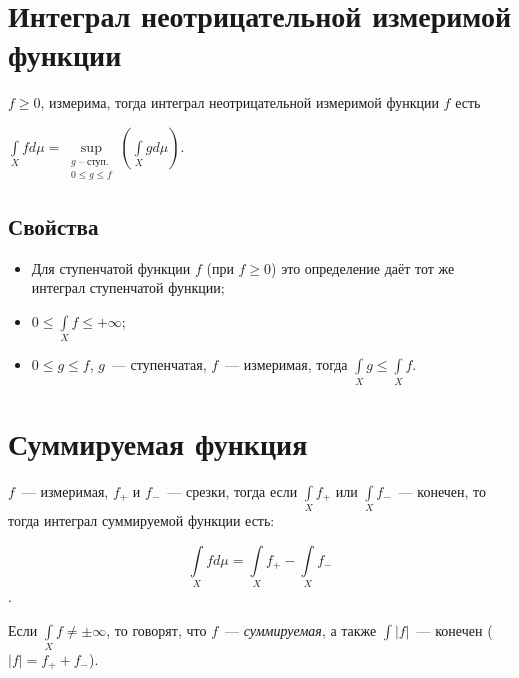 \documentclass{article}
\begin{document}
    \newpage
    
    \section{Интеграл неотрицательной измеримой функции}
    
        $f \geqslant 0$, измерима, тогда интеграл неотрицательной измеримой функции $f$ есть
        
        $\int\limits_{X} f d \mu = \sup\limits_{\substack{\text{$g$~-- ступ.} \\ 0 \leqslant g \leqslant f}} \left( \int\limits_{X} g d \mu \right)$.
            
        \subsection{Свойства}
                
            \begin{itemize}
                
                \item Для ступенчатой функции $f$ (при $f \geqslant 0$) это определение даёт тот же интеграл ступенчатой функции;
                    
                \item $0 \leqslant \int\limits_{X} f \leqslant +\infty$;
                    
                \item $0 \leqslant g \leqslant f$, $g$~--- ступенчатая, $f$~--- измеримая, тогда $\int\limits_{X} g \leqslant \int\limits_{X} f$.
                    
            \end{itemize}
                
    \newpage
    
    \section{Суммируемая функция}
    
        $f$~--- измеримая, $f_+$ и $f_-$~--- срезки, тогда если $\int\limits_{X} f_+$ или $\int\limits_{X} f_-$~--- конечен, то тогда интеграл суммируемой функции есть:
            
        $$\int\limits_{X} f d \mu = \int\limits_{X} f_+ - \int\limits_{X} f_-$$. 
                
        Если $\int\limits_{X} f \neq \pm \infty$, то говорят, что $f$~--- \textit{суммируемая}, а также $\int |f|$~--- конечен ($|f| = f_+ + f_-$).
                
\end{document}
